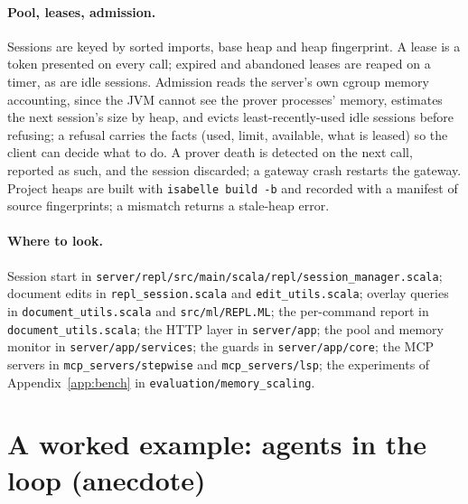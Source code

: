 \documentclass[11pt]{article}
\newcommand{\code}[1]{\colorbox{gray!12}{\texttt{\vphantom{Ag}#1}}}
\begin{document}
\paragraph{Pool, leases, admission.} Sessions are keyed by sorted
imports, base heap and heap fingerprint. A lease is a token presented on
every call; expired and abandoned leases are reaped on a timer, as are idle
sessions. Admission reads the server's own cgroup memory accounting, since
the JVM cannot see the prover processes' memory, estimates the next
session's size by heap, and evicts least-recently-used idle sessions
before refusing; a refusal carries the facts (used, limit, available,
what is leased) so the client can decide what to do. A prover death is
detected on the next call, reported as such, and the session discarded; a
gateway crash restarts the gateway. Project heaps are built with
\code{isabelle build -b} and recorded with a manifest of source
fingerprints; a mismatch returns a stale-heap error.

\paragraph{Where to look.} Session start in
\code{server/repl/src/main/scala/repl/session\_manager.scala}; document
edits in \code{repl\_session.scala} and \code{edit\_utils.scala}; overlay
queries in \code{document\_utils.scala} and \code{src/ml/REPL.ML}; the
per-command report in \code{document\_utils.scala}; the HTTP layer in
\code{server/app}; the pool and memory monitor in
\code{server/app/services}; the guards in \code{server/app/core}; the MCP
servers in \code{mcp\_servers/stepwise} and \code{mcp\_servers/lsp}; the
experiments of Appendix~\ref{app:bench} in
\code{evaluation/memory\_scaling}.

\section{A worked example: agents in the loop (anecdote)}
\label{app:example}
\end{document}
